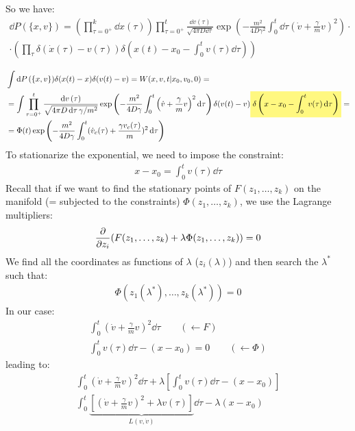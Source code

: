\documentclass[../template.tex]{subfiles}
\begin{document}
So we have:
\begin{align*}
    \dd{P}(\{x,v\}) = \left(\prod_{\tau = 0^+}^k \dd{x}(\tau)\right) \prod_{\tau = 0^+}^t \frac{\dd{v}(\tau)}{\sqrt{4 \pi D \dd{\tau}} } \exp\left(-\frac{m^2}{4 D \gamma^2} \int_0^t \dd{\tau} (\dot{v} + \frac{\gamma}{m} v )^2 \right) \cdot\\
    \cdot \left(\prod_\tau \delta(\dot{x}(\tau)- v(\tau)) \delta(x(t) - x_0 - \int_0^t v(\tau) \dd{\tau})\right) 
\end{align*}

\begin{align*}
    &\int \dd{P}(\{x,v\})  \delta(x(t)-x) \delta(v(t)-v) = W(x,v,t|x_0, v_0, 0) = \\
    &= \int \prod_{\tau = 0^+}^t \frac{\dd{v}(\tau)}{\sqrt{4 \pi D \dd{\tau} \gamma /m^2}} \exp\left(-\frac{m^2}{4 D \gamma} \int_0^t \left(\dot{v} + \frac{\gamma}{m} v \right)^2 \dd{\tau} \right) \delta(v(t) -v )\hlc{Yellow}{ \delta\left(x-x_0 - \int_0^t v(\tau) \dd{\tau}\right) }=\\
    &= \Phi(t) \exp\left(-\frac{m^2}{4 D \gamma} \int_0^t (\dot{v}_c(\tau) + \frac{\gamma v_c(\tau)}{m} )^2 \dd{\tau} \right)
\end{align*}
To stationarize the exponential, we need to impose the constraint:
\begin{align*}
    x-x_0 = \int_0^t v(\tau) \dd{\tau}
\end{align*}
Recall that if we want to find the stationary points of $F(z_1, \dots, z_k)$ on the manifold (= subjected to the constraints) $\Phi (z_1, \dots, z_k)$, we use the Lagrange multipliers:
\begin{align*}
    \pdv{z_i} (F(z_1, \dots, z_k) + \lambda \Phi (z_1, \dots, z_k)) = 0 
\end{align*} 
We find all the coordinates as functions of $\lambda$ ($z_i(\lambda)$) and then search the $\lambda^*$ such that:
\begin{align*}
    \Phi(z_1(\lambda^*), \dots, z_k(\lambda^*)) = 0
\end{align*} 
In our case:
\begin{align*}
    \int_0^t \left(\dot{v} + \frac{\gamma}{m} v \right)^2 \dd{\tau} \qquad(\leftarrow F)\\
    \int_0^t v(\tau)\dd{\tau} - (x-x_0) = 0 \qquad (\leftarrow \Phi)
\end{align*}
leading to:
\begin{align*}
    \int_0^t \left(\dot{v} + \frac{\gamma}{m}v \right)^2 \dd{\tau} + \lambda \left[\int_0^t v(\tau) \dd{\tau} - (x-x_0)\right]\\
    \int_0^t \underbrace{\left[\left(\dot{v} + \frac{\gamma}{m} v \right)^2 + \lambda v(\tau)\right]}_{L(v,\dot{v})} \dd{\tau} - \lambda(x-x_0)
\end{align*}
\end{document}
